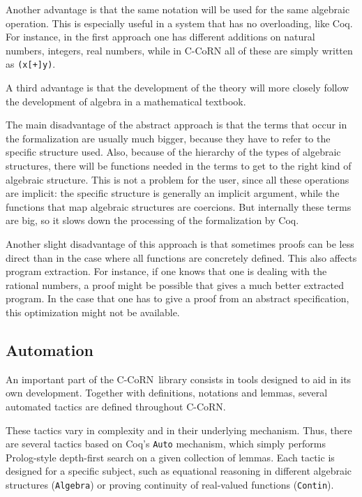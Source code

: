 \documentclass[runningheads]{llncs}
\newcommand{\ccorn}{\mbox{C-CoRN}}
\newcommand{\coq}{Coq}
\begin{document}
Another advantage is that the same notation will be used
for the same algebraic operation.
This is especially useful in a system that has no overloading,
like Coq.
For instance, in the first approach one has different additions
on natural numbers, integers, real numbers,
while in {\ccorn} all of these are simply written as \texttt{(x[+]y)}.

A third advantage is that the development of the theory will
more closely follow the development of algebra in a mathematical
textbook.

The main disadvantage of the abstract approach is that
the terms that occur in the formalization are usually much bigger,
because they have to refer to the specific structure used.
Also, because of the hierarchy of the types of algebraic
structures, there will be functions needed in the terms to get to the
right kind of algebraic structure.
This is not a problem for the user, since
all these operations are implicit:
the specific structure is generally an implicit argument,
while the functions that map algebraic structures are
coercions.
But internally these terms are big,
so it slows down the processing of the formalization by Coq.

Another slight disadvantage of this approach is that
sometimes proofs can be less direct than in the case where
all functions are concretely defined.
This also affects program extraction.
For instance, if one knows that one is dealing with the
rational numbers, a proof might be possible that gives
a much better extracted program.
In the case that one has to give a proof from an abstract specification,
this optimization might not be available.

\subsection*{Automation}

An important part of the \ccorn\ library consists in tools designed to aid in
its own development.
Together with definitions, notations and lemmas, several automated tactics are
defined throughout \ccorn.

These tactics vary in complexity and in their underlying mechanism.
Thus, there are several tactics based on \coq's \texttt{Auto} mechanism, which
simply performs Prolog-style depth-first search on a given collection of
lemmas.
Each tactic is designed for a specific subject, such as 
equational reasoning in different algebraic structures (\texttt{Algebra}) or proving
continuity of real-valued functions
(\texttt{Contin}).
\end{document}
